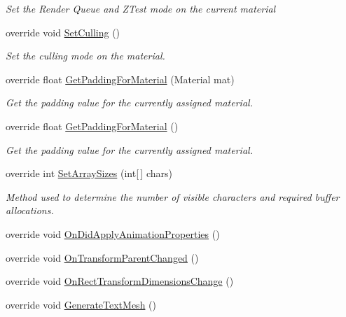\begin{DoxyCompactItemize}
\begin{DoxyCompactList}\small\item\em Set the Render Queue and Z\+Test mode on the current material \end{DoxyCompactList}\item 
override void \mbox{\hyperlink{class_t_m_pro_1_1_text_mesh_pro_a0754ccdc79d70ff05ffaf120bf766c4b}{Set\+Culling}} ()
\begin{DoxyCompactList}\small\item\em Set the culling mode on the material. \end{DoxyCompactList}\item 
override float \mbox{\hyperlink{class_t_m_pro_1_1_text_mesh_pro_ad427fd2cbd79c9304efac4b9a496a234}{Get\+Padding\+For\+Material}} (Material mat)
\begin{DoxyCompactList}\small\item\em Get the padding value for the currently assigned material. \end{DoxyCompactList}\item 
override float \mbox{\hyperlink{class_t_m_pro_1_1_text_mesh_pro_ac5fee6a94cf72cc38078e03bbf662ae4}{Get\+Padding\+For\+Material}} ()
\begin{DoxyCompactList}\small\item\em Get the padding value for the currently assigned material. \end{DoxyCompactList}\item 
override int \mbox{\hyperlink{class_t_m_pro_1_1_text_mesh_pro_a1fcd15c0e6dab2ae7d3cb013d1bdc3c3}{Set\+Array\+Sizes}} (int\mbox{[}$\,$\mbox{]} chars)
\begin{DoxyCompactList}\small\item\em Method used to determine the number of visible characters and required buffer allocations. \end{DoxyCompactList}\item 
override void \mbox{\hyperlink{class_t_m_pro_1_1_text_mesh_pro_a63606af11bff27b7a0f6354c8568815b}{On\+Did\+Apply\+Animation\+Properties}} ()
\item 
override void \mbox{\hyperlink{class_t_m_pro_1_1_text_mesh_pro_a1b05e716ed23eef4ea21df60889a0ae1}{On\+Transform\+Parent\+Changed}} ()
\item 
override void \mbox{\hyperlink{class_t_m_pro_1_1_text_mesh_pro_a65ff2fbd27378e530d78792ef5c517e0}{On\+Rect\+Transform\+Dimensions\+Change}} ()
\item 
override void \mbox{\hyperlink{class_t_m_pro_1_1_text_mesh_pro_aa98e9ced224ca5ce5e71cbf213645128}{Generate\+Text\+Mesh}} ()

\end{DoxyCompactItemize}
